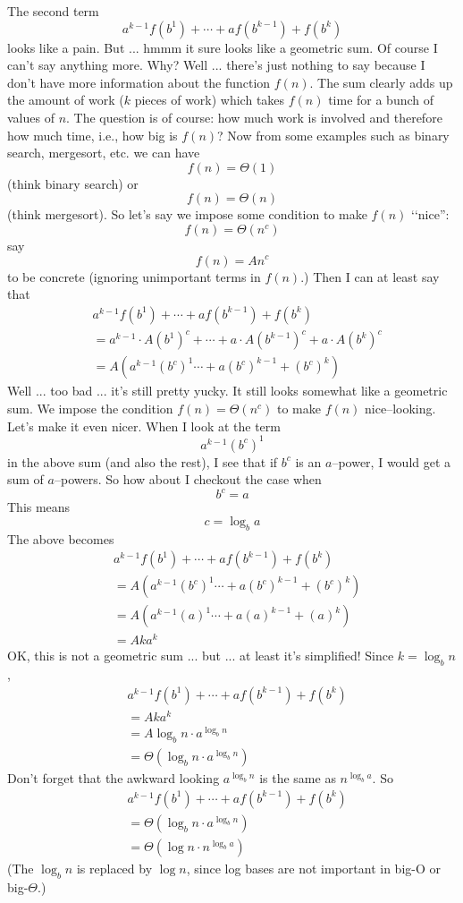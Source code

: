 The second term
\[
   a^{k-1} f(b^1) + \cdots + a f(b^{k-1}) + f(b^k)
\]
looks like a pain.
But ... hmmm it sure looks like a geometric sum.
Of course I can't say anything more. Why? Well ... there's just nothing to say
because I don't have more information about the function $f(n)$.
The sum clearly adds up the amount of work ($k$ pieces of work)
which takes $f(n)$ time 
for a bunch of values of $n$. 
The question is of course: how much work is involved and therefore
how much time, i.e., how big is $f(n)$?
Now from some examples such as binary search, mergesort, etc.
we can have
\[
f(n) = \Theta(1)
\]
(think binary search)
or
\[
f(n) = \Theta(n)
\]
(think mergesort).
So let's say we impose some condition to make $f(n)$ \lq\lq nice'':
\[
f(n) = \Theta(n^c)
\]
say
\[
f(n) = An^c
\]
to be concrete (ignoring unimportant terms in $f(n)$.)
Then I can at least say that 
\begin{align*}
&a^{k-1} f(b^1) + \cdots + a f(b^{k-1}) + f(b^k) \\
&= a^{k-1} \cdot A(b^1)^c
   + \cdots
   + a \cdot A (b^{k-1})^c
   + a \cdot A (b^{k})^c \\
&= A \left(
   a^{k-1} (b^c)^{1}
   \cdots
   + a (b^c)^{k-1}
   + (b^c)^{k}
   \right)
\end{align*}
Well ... too bad ... it's still pretty yucky.
It still looks somewhat like a geometric sum.
We impose the condition $f(n) = \Theta(n^c)$ to make $f(n)$
nice--looking.
Let's make it even nicer.
When I look at the term
\[
a^{k-1} (b^c)^{1}
\]
in the above sum (and also the rest), I see that if $b^c$ is an $a$--power,
I would get a sum of $a$--powers.
So how about I checkout the case when
\[
b^c = a
\]
This means
\[
c = \log_b a
\]
The above becomes
\begin{align*}
&a^{k-1} f(b^1) + \cdots + a f(b^{k-1}) + f(b^k) \\
&= A \left(
   a^{k-1} (b^c)^{1}
   \cdots
   + a (b^c)^{k-1}
   + (b^c)^{k}
   \right)
   \\
&= A \left(
   a^{k-1} (a)^{1}
   \cdots
   + a (a)^{k-1}
   + (a)^{k}
   \right)
   \\
&= A ka^k
\end{align*}
OK, this is not a geometric sum ... but ... at least it's
simplified!
Since $k = \log_b n$,
\begin{align*}
&a^{k-1} f(b^1) + \cdots + a f(b^{k-1}) + f(b^k) \\
&= A ka^k \\
&= A \log_b n \cdot a^{\log_b n} \\
&= \Theta \left( \log_b n \cdot  a^{\log_b n}\right)
\end{align*}
Don't forget that the awkward looking $a^{\log_b n}$ is
the same as $n^{\log_b a}$.
So
\begin{align*}
&a^{k-1} f(b^1) + \cdots + a f(b^{k-1}) + f(b^k) \\
&= \Theta \left( \log_b n \cdot  a^{\log_b n}\right) \\
&= \Theta \left( \log n \cdot  n^{\log_b a}\right)
\end{align*}
(The $\log_b n$ is replaced by $\log n$, since log bases are not
important in big-O or big-$\Theta$.)

